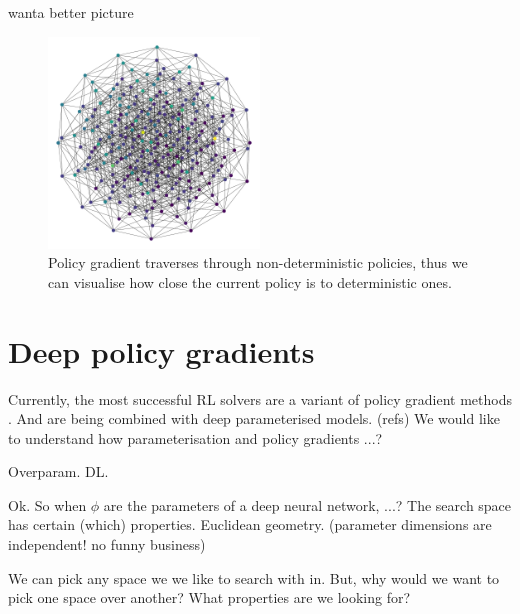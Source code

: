 {\color{red} wanta better picture}

\begin{figure}[!h]
\centering
\includegraphics[width=0.5\textwidth,height=0.3\textheight]{../../pictures/figures/interior-graph.png}
\caption{Policy gradient traverses through non-deterministic policies, thus we can visualise how
close the current policy is to deterministic ones.}
\end{figure}


\section{Deep policy gradients}\label{ss-extras}

Currently, the most successful RL solvers are a variant of policy gradient methods \cite{Mnih2016,Schulmanb}.
And are being combined with deep parameterised models. (refs)
We would like to understand how parameterisation and policy gradients ...?


Overparam. DL. \cite{Arora2018}

Ok. So when $\phi$ are the parameters of a deep neural network, ...? The search space has certain (which) properties.
Euclidean geometry.
(parameter dimensions are independent! no funny business)

We can pick any space we we like to search with in. But, why would we want to pick one space over another?
What properties are we looking for?


